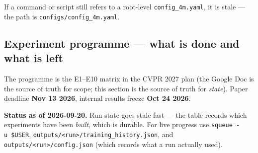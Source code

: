\documentclass[
  10pt,
]{article}
\begin{document}
If a command or script still refers to a root-level
\texttt{config\_4m.yaml}, it is stale --- the path is
\texttt{configs/config\_4m.yaml}.

\subsection{Experiment programme --- what is done and what is
left}\label{experiment-programme-what-is-done-and-what-is-left}

The programme is the E1--E10 matrix in the CVPR 2027 plan (the Google
Doc is the source of truth for scope; this section is the source of
truth for \emph{state}). Paper deadline \textbf{Nov 13 2026}, internal
results freeze \textbf{Oct 24 2026}.

\textbf{Status as of 2026-09-20.} Run state goes stale fast --- the
table records which experiments have been \emph{built}, which is
durable. For live progress use \texttt{squeue\ -u\ \$USER},
\texttt{outputs/\textless{}run\textgreater{}/training\_history.json},
and \texttt{outputs/\textless{}run\textgreater{}/config.json} (which
records what a run actually used).
\end{document}
